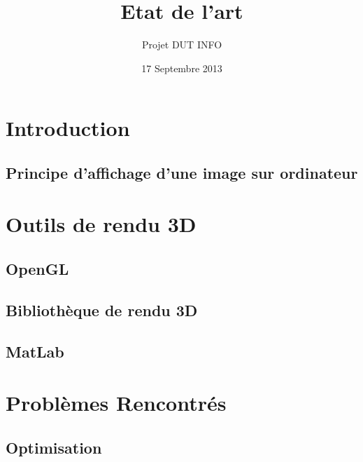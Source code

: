 \documentclass{report}
\title{Etat de l'art}
\author{Projet DUT INFO}
\date{17 Septembre 2013}
\begin{document}
\maketitle
\tableofcontents

\part{Introduction}

\chapter{Principe d'affichage d'une image sur ordinateur}


\part{Outils de rendu 3D}

\chapter{OpenGL}


\chapter{Bibliothèque de rendu 3D}



\chapter{MatLab}

\part{Problèmes Rencontrés}

\chapter{Optimisation}
\newpage
\end{document}
